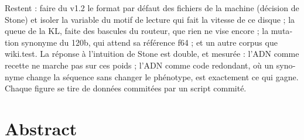\begin{otherlanguage}{french}
Restent : faire du v1.2 le format par défaut des fichiers de la machine (décision de Stone) et isoler la variable du motif de lecture qui fait la vitesse de ce disque ; la queue de la KL, faite des bascules du routeur, que rien ne vise encore ; la mutation synonyme du 120b, qui attend sa référence f64 ; et un autre corpus que wiki.test. La réponse à l'intuition de Stone est double, et mesurée : l'ADN comme recette ne marche pas sur ces poids ; l'ADN comme code redondant, où un synonyme change la séquence sans changer le phénotype, est exactement ce qui gagne. Chaque figure se tire de données commitées par un script commité.
\end{otherlanguage}

\chapter*{Abstract}
